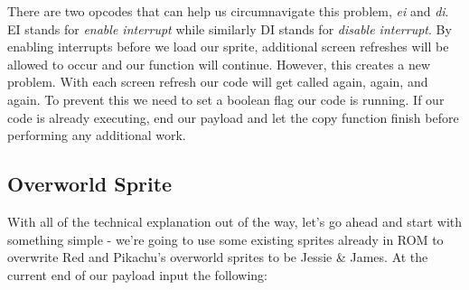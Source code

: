 \documentclass[../main.tex]{subfiles}
\begin{document}
    There are two opcodes that can help us circumnavigate this problem, \textit{ei} and \textit{di}.  EI stands for \textit{enable interrupt} while similarly DI stands for \textit{disable interrupt}.  By enabling interrupts before we load our sprite, additional screen refreshes will be allowed to occur and our function will continue.  However, this creates a new problem.  With each screen refresh our code will get called again, again, and again.  To prevent this we need to set a boolean flag our code is running.  If our code is already executing, end our payload and let the copy function finish before performing any additional work.

    \subsection{Overworld Sprite}\label{owsprites}
    With all of the technical explanation out of the way, let's go ahead and start with something simple - we're going to use some existing sprites already in ROM to overwrite Red and Pikachu's overworld sprites to be Jessie \& James.  At the current end of our payload input the following:
\end{document}

